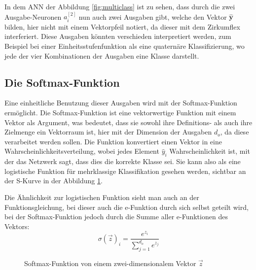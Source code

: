 \documentclass[12pt,titlepage]{article}
\begin{document}
In dem ANN der Abbildung \ref{fig:multiclass} ist zu sehen, dass durch die zwei Ausgabe-Neuronen \(a_i^{[2]}\) nun auch zwei Ausgaben gibt, welche den Vektor \(\mathbf{\hat{y}}\) bilden, hier nicht mit einem Vektorpfeil notiert, da dieser mit dem Zirkumflex interferiert. Diese Ausgaben könnten verschieden interpretiert werden, zum Beispiel bei einer Einheitsstufenfunktion als eine quaternäre Klassifizierung, wo jede der vier Kombinationen der Ausgaben eine Klasse darstellt.

\subsection{Die Softmax-Funktion}

Eine einheitliche Benutzung dieser Ausgaben wird mit der Softmax-Funktion ermöglicht. Die Softmax-Funktion ist eine vektorwertige Funktion mit einem Vektor als Argument, was bedeutet, dass sie sowohl ihre Definitions- als auch ihre Zielmenge ein Vektorraum ist, hier mit der Dimension der Ausgaben $d_o$, da diese verarbeitet werden sollen. Die Funktion konvertiert einen Vektor in eine Wahrscheinlichkeitsverteilung, wobei jedes Element \(\hat y_i\) Wahrscheinlichkeit ist, mit der das Netzwerk sagt, dass dies die korrekte Klasse sei. Sie kann also als eine logistische Funktion für mehrklassige Klassifikation gesehen werden, sichtbar an der S-Kurve in der Abbildung \ref{fig:softmax}.

Die Ähnlichkeit zur logistischen Funktion sieht man auch an der Funktionsgleichung, bei dieser auch die e-Funktion durch sich selbst geteilt wird, bei der Softmax-Funktion jedoch durch die Summe aller e-Funktionen des Vektors:
\[
  \sigma(\vec{z})_i = \frac{ e^{z_i} }{ \sum_{j=1}^{d_o} e^{z_j} }
\]

\begin{figure}[H]
  \centering


  \caption{Softmax-Funktion von einem zwei-dimensionalem Vektor $\vec{z}$}
  \label{fig:softmax}
\end{figure}
\end{document}
